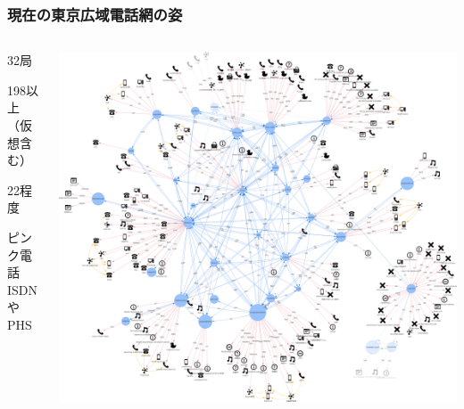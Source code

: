 \documentclass[
  lualatex,
  aspectratio=169,
  14pt
]{beamer}
\begin{document}
\begin{frame}
  \frametitle{現在の東京広域電話網の姿}

  \begin{columns}
    \begin{column}{.28\textwidth}
      \begin{description}[labelwidth=\linewidth]
        \item[交換局数]
          32局
        \item[端末数]
          198以上\\
          （仮想含む）
        \item[うち黒電話]
          22程度
        \item[その他]
          ピンク電話\\
          ISDNやPHS
      \end{description}
    \end{column}
    \begin{column}{.7\textwidth}
      \centering
      \includegraphics[height=.88\textheight]{./images/mantela.png}
    \end{column}
  \end{columns}

\end{frame}
\end{document}
